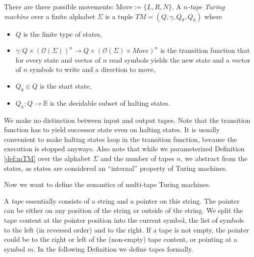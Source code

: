 \documentclass{psartcl}
\newcommand{\setOf}[1]{\bigl \{ #1 \bigr \}}
\newcommand{\from}{:}
\renewcommand{\to}{\rightarrow}
\newcommand{\Opt}{\mathcal{O}}
\newcommand{\Bool}{\mathbb{B}}
\begin{document}
\begin{definition}
  \label{def:mTM}
  There are three possible movements:  $\text{Move} := \setOf{L, R, N}$.
  A \emph{$n$-tape Turing machine} over a finite alphabet $\Sigma$ is a tuple $TM = (Q, \gamma, Q_0, Q_h)$ where
  \begin{itemize}
    \item $Q$ is the finite type of states,
    \item $\gamma \from Q \times (\Opt(\Sigma))^n \to Q \times (\Opt(\Sigma) \times Move)^n$ is the transition function that for every state and
      vector of $n$ read symbols yields the new state and a vector of $n$ symbols to write and a direction to move,
    \item $Q_0 \in Q$ is the start state,
    \item $Q_h \from Q \to \Bool$ is the decidable subset of halting states.
  \end{itemize}
\end{definition}

We make no distinction between input and output tapes.  Note that the transition function has to yield successor state even on halting states.  It is
usually convenient to make halting states loop in the transition function, because the execution is stopped anyways.  Also note that while we
parameterized Definition \ref{def:mTM} over the alphabet $\Sigma$ and the number of tapes $n$, we abstract from the states, as states are considered
an ``internal'' property of Turing machines.

Now we want to define the semantics of multi-tape Turing machines.

A \emph{tape} essentially consists of a string and a pointer on this string.  The pointer can be either on any position of the string or outside of
the string.  We split the tape content at the pointer position into the current symbol, the list of symbols to the left (in reversed order) and to the
right.  If a tape is not empty, the pointer could be to the right or left of the (non-empty) tape content, or pointing at a symbol $m$.  In the
following Definition we define tapes formally.
\end{document}

